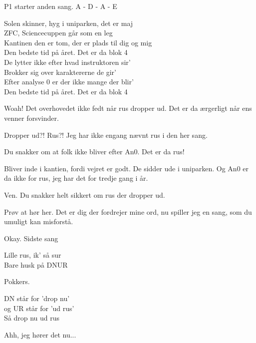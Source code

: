\documentclass[a4paper,11pt]{article}
\begin{document}
\begin{sketch}
\scene P1 starter anden sang. A - D - A - E

 Solen skinner, hyg i uniparken, det er maj \\
			ZFC, Sciencecuppen går som en leg\\
			Kantinen den er tom, der er plads til dig og mig\\
			Den bedste tid på året. Det er da blok 4\\[3mm]
			De lytter ikke efter hvad instruktoren sir'\\
			Brokker sig over karaktererne de gir'\\
			Efter analyse 0 er der ikke mange der blir'\\
			Den bedste tid på året. Det er da blok 4

 Woah! Det overhovedet ikke fedt når rus dropper ud. Det er da ærgerligt når ens venner forsvinder. 

 Dropper ud?! Rus?! Jeg har ikke engang nævnt rus i den her sang. 

 Du snakker om at folk ikke bliver efter An0. Det er da rus!

 Bliver inde i kantien, fordi vejret er godt. De sidder ude i uniparken. Og An0 er da ikke for rus, jeg har det for tredje gang i år. 

 Ven. Du snakker helt sikkert om rus der dropper ud.

 Prøv at hør her. Det er dig der fordrejer mine ord, nu spiller jeg en sang, som du umuligt kan misforstå.

 Okay. Sidste sang


 Lille rus, ik' så sur \\
    Bare husk på DNUR
			

 Pokkers.


	DN står for 'drop nu'\\
			og UR står for 'ud rus'\\
			Så drop nu ud rus
			
 Ahh, jeg hører det nu...


\end{sketch}
\end{document}
